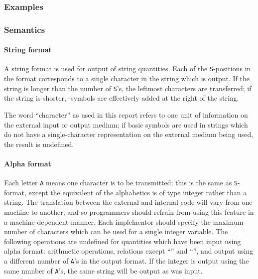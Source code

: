 \documentclass[a4paper,11pt]{article}
\begin{document}
\subsubsection{Examples}



\subsubsection{Semantics}

\paragraph{String format}

A string format is used for output of string quantities.  Each of the
{\tt S}-positions in the format corresponds to a single character in
the string which is output.  If the string is longer than the number
of {\tt S}'s, the leftmost characters are transferred; if the string
is shorter, \blankchar{}-symbols are effectively added at the right of
the string.

The word ``character'' as used in this report refers to one unit of
information on the external input or output medimn; if \Algol basic
symbols are used in strings which do not have a single-character
representation on the external medium being used, the result is
undefined.

\paragraph{Alpha format}
\label{Lbl++Formats+Other+Semantics+Alpha}

Each letter {\tt A} means one character is to be transmitted; this is
the same as {\tt S}-format, except the \Algol equivalent of the
alphabetics is of type integer rather than a string.  The translation
between the external and internal code will vary from one machine to
another, and so programmers should refrain from using this feature in
a machine-dependent manner.  Each implelnentor should specify the
maximum number of characters which can be used for a single integer
variable.  The following operations are undefined for quantities which
have been input using alpha format: arithmetic operations, relations
except ``\meq'' and ``\mne'', and output using a different number of
{\tt A}'s in the output format.  If the integer is output using the
same nmnber of {\tt A}'s, the same string will be output as was input.
\end{document}
